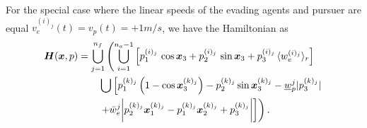 \begin{corollary}
	For the special case where the linear speeds of the evading agents and pursuer are equal \ie $v_e^{(i)_j}(t) = v_p(t) = +1 m/s$, we have the Hamiltonian as
	\begin{align}
		\bm{H}(\bm{x}, p) & = \bigcup_{j=1}^{n_f} \left( \bigcup_{i=1}^{n_a-1} 
		\left[p_1^{(i)_j} \,  \cos \bm{x}_3 + p_2^{(i)_j} \,  \sin \bm{x}_3 + p_3^{(i)_j}\, \langle w_e^{(i)_j}\rangle_r\right] \right.\nonumber \\
		& \qquad \left. \bigcup \left[
		p_1^{(k)_j} \left(1 - \cos \bm{x}_3^{(k)_j}\right) - p_2^{(k)_j} \sin \bm{x}_3^{(k)_j} - \underline{w}_p^j |p_3^{(k)_j}|   \right. \right. \nonumber \\
		& \qquad \left.  \left. 
		+ \bar{w}_e^j \bigg|p_2^{(k)_j} \bm{x}_1^{(k)_j} - p_1^{(k)_j}\bm{x}_2^{(k)_j} + p_3^{(k)_j}\bigg|
		\right] \right).
		\label{eq:HamiltonianCompletada}
	\end{align}
\end{corollary}
%

